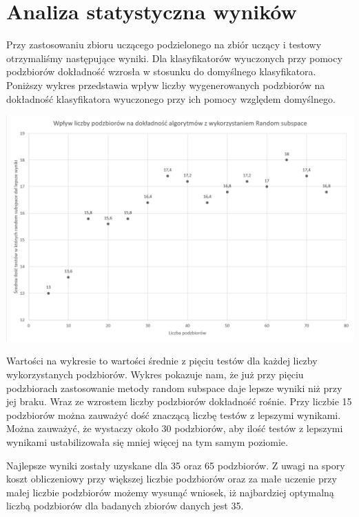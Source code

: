 \documentclass[12pt,onecolumn,technote]{IEEEtran}
\begin{document}
\section{Analiza statystyczna wyników}
Przy zastosowaniu zbioru uczącego podzielonego na zbiór uczący i testowy otrzymaliśmy następujące wyniki.
Dla klasyfikatorów wyuczonych przy pomocy podzbiorów dokładność wzrosła w stosunku do domyślnego klasyfikatora. 
Poniższy wykres przedstawia wpływ liczby wygenerowanych podzbiorów na dokładność klasyfikatora wyuczonego przy ich pomocy względem domyślnego.


\newpage
\includegraphics[height=\textwidth,width=24cm,angle=90]{wykres.png}
\newpage


Wartości na wykresie to wartości średnie z pięciu testów dla każdej liczby wykorzystanych podzbiorów. Wykres pokazuje nam, że już przy pięciu podzbiorach zastosowanie metody random subspace daje lepsze wyniki niż przy jej braku. Wraz ze wzrostem liczby podzbiorów dokładność rośnie. Przy liczbie 15 podzbiorów można zauważyć dość znaczącą liczbę testów z lepszymi wynikami. Można zauważyć, że wystaczy około 30 podzbiorów, aby ilość testów z lepszymi wynikami ustabilizowała się mniej więcej na tym samym poziomie. 

Najlepsze wyniki zostały uzyskane dla 35 oraz 65 podzbiorów. Z uwagi na spory koszt obliczeniowy przy większej liczbie podzbiorów oraz za małe uczenie przy małej liczbie podzbiorów możemy wysunąć wniosek, iż najbardziej optymalną liczbą podzbiorów dla badanych zbiorów danych jest 35.
\end{document}
